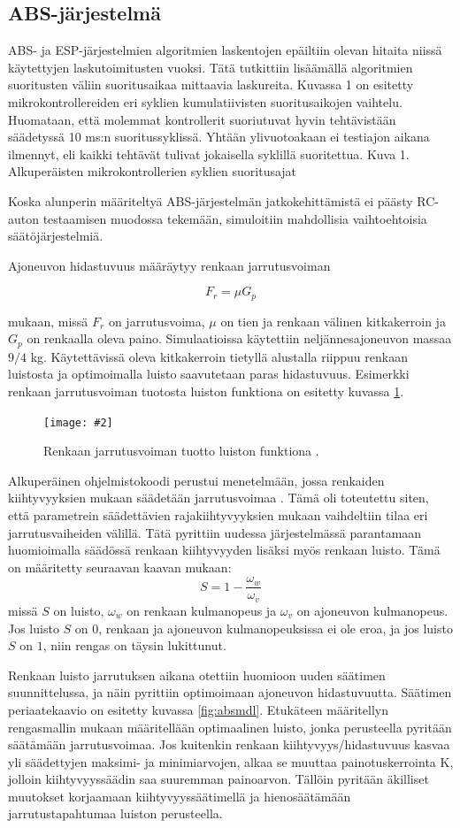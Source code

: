 \documentclass{article}
\newcommand{\kuvaa}[4]{%
	\begin{figure}[h]%
		\centering \texttt{[image: \#2]}%
		\caption{#3 \label{fig:#4}}%
	\end{figure}%
}
\begin{document}
\subsection{ABS-järjestelmä}
ABS- ja ESP-järjestelmien algoritmien laskentojen epäiltiin olevan hitaita niissä käytettyjen laskutoimitusten vuoksi. Tätä tutkittiin lisäämällä algoritmien suoritusten väliin suoritusaikaa mittaavia laskureita. Kuvassa 1 on esitetty mikrokontrollereiden eri syklien kumulatiivisten suoritusaikojen vaihtelu. Huomataan, että molemmat kontrollerit suoriutuvat hyvin tehtävistään säädetyssä 10 ms:n suoritussyklissä. Yhtään ylivuotoakaan ei testiajon aikana ilmennyt, eli kaikki tehtävät tulivat jokaisella syklillä suoritettua.
Kuva 1. Alkuperäisten mikrokontrollerien syklien suoritusajat

Koska alunperin määriteltyä ABS-järjestelmän jatkokehittämistä ei päästy RC-auton testaamisen muodossa tekemään, simuloitiin mahdollisia vaihtoehtoisia säätöjärjestelmiä. 

Ajoneuvon hidastuvuus määräytyy renkaan jarrutusvoiman

\[
	F_r = \mu G_p
\]

mukaan, missä $F_r$ on jarrutusvoima, $\mu$ on tien ja renkaan välinen kitkakerroin ja $G_p$ on renkaalla oleva paino. Simulaatioissa käytettiin neljännesajoneuvon massaa $9/4$ kg. Käytettävissä oleva kitkakerroin tietyllä alustalla riippuu renkaan luistosta\cite{bib:milliken} ja optimoimalla luisto saavutetaan paras hidastuvuus. Esimerkki renkaan jarrutusvoiman tuotosta luiston funktiona on esitetty kuvassa \ref{fig:slip}.

\kuvaa{0.8}{frVsSlip}{Renkaan jarrutusvoiman tuotto luiston funktiona \cite{bib:milliken}.}{slip}

Alkuperäinen ohjelmistokoodi perustui menetelmään, jossa renkaiden kiihtyvyyksien mukaan säädetään jarrutusvoimaa \cite{bib:bosch}. Tämä oli toteutettu siten, että parametrein säädettävien rajakiihtyvyyksien mukaan vaihdeltiin tilaa eri jarrutusvaiheiden välillä. Tätä pyrittiin uudessa järjestelmässä parantamaan huomioimalla säädössä renkaan kiihtyvyyden lisäksi myös renkaan luisto. Tämä on määritetty seuraavan kaavan mukaan:
\[
	S = 1 - \frac{\omega_w}{\omega_v}
\]
missä $S$ on luisto, $\omega_w$ on renkaan kulmanopeus ja $\omega_v$ on ajoneuvon kulmanopeus. Jos luisto $S$ on $0$, renkaan ja ajoneuvon kulmanopeuksissa ei ole eroa, ja jos luisto $S$ on $1$, niin rengas on täysin lukittunut.

Renkaan luisto jarrutuksen aikana otettiin huomioon uuden säätimen suunnittelussa, ja näin pyrittiin optimoimaan ajoneuvon hidastuvuutta. Säätimen periaatekaavio on esitetty kuvassa \ref{fig:absmdl}. Etukäteen määritellyn rengasmallin mukaan määritellään optimaalinen luisto, jonka perusteella pyritään säätämään jarrutusvoimaa. Jos kuitenkin renkaan kiihtyvyys/hidastuvuus kasvaa yli säädettyjen maksimi- ja minimiarvojen, alkaa se muuttaa painotuskerrointa K, jolloin kiihtyvyyssäädin saa suuremman painoarvon. Tällöin pyritään äkilliset muutokset korjaamaan kiihtyvyyssäätimellä ja hienosäätämään jarrutustapahtumaa luiston perusteella.
\end{document}
